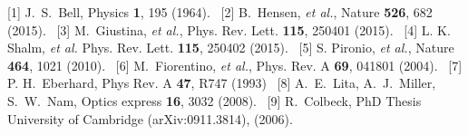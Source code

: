 \documentclass[portrait,a0,final]{a0poster}
\newenvironment{poster}{
  \begin{center}
  \begin{minipage}[c]{0.98\textwidth}
}{
  \end{minipage}
  \end{center}
}
\begin{document}
\begin{poster}
\begin{multicols}{2}
  {\small
  \begin{flushleft}
  \noindent
  [1] J.~S.~Bell,
    Physics  \textbf{1}, 195 (1964).
  \newline
  ~[2] B.~Hensen, \textit{et al.},
    Nature \textbf{526}, 682 (2015).
  \newline
  ~[3] M.~Giustina, \textit{et al.},
    Phys. Rev. Lett. \textbf{115}, 250401 (2015).
  \newline
  ~[4] L. K. Shalm, \textit{et al.}
    Phys. Rev. Lett. \textbf{115}, 250402 (2015).
  \newline
  ~[5] S. Pironio, \textit{et al.},
    Nature \textbf{464}, 1021 (2010).
  \newline
  ~[6] M.~Fiorentino, \textit{et al.},
    Phys. Rev. A \textbf{69}, 041801 (2004).
  \newline
  ~[7] P. H.~Eberhard,
    Phys Rev. A \textbf{47}, R747 (1993)
  \newline
  ~[8] A.~E.~Lita, A.~J.~Miller, S.~W.~Nam,
    Optics express \textbf{16}, 3032 (2008).
  \newline
  ~[9] R.~Colbeck, PhD Thesis University of Cambridge (arXiv:0911.3814), (2006). %
  \newline

\end{flushleft}}
\end{multicols}
\end{poster}
\end{document}
